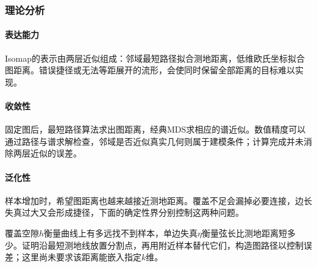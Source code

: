 \subsubsection{理论分析}
\label{sec:dim-isomap-theory}

\paragraph{表达能力}
Isomap的表示由两层近似组成：邻域最短路径拟合测地距离，低维欧氏坐标拟合图距离。错误捷径或无法等距展开的流形，会使同时保留全部距离的目标难以实现。

\paragraph{收敛性}
固定图后，最短路径算法求出图距离，经典MDS求相应的谱近似。数值精度可以通过路径与谱求解检查，邻域是否近似真实几何则属于建模条件；计算完成并未消除两层近似的误差。

\paragraph{泛化性}
样本增加时，希望图距离也越来越接近测地距离。覆盖不足会漏掉必要连接，边长失真过大又会形成捷径，下面的确定性界分别控制这两种问题。

覆盖空隙$h$衡量曲线上有多远找不到样本，单边失真$\eta$衡量弦长比测地距离短多少。证明沿最短测地线放置分割点，再用附近样本替代它们，构造图路径以控制误差；这里尚未要求该距离能嵌入指定$k$维。

